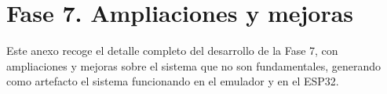 \documentclass[../main.tex]{subfiles}
\begin{document}
	\chapter{Fase 7. Ampliaciones y mejoras}
	\label{sec:DerarrolloFase7}
	
	Este anexo recoge el detalle completo del desarrollo de la Fase 7, con ampliaciones y mejoras sobre el sistema que no son fundamentales, generando como artefacto el sistema funcionando en el emulador y en el ESP32.
	
	
	\clearpage
	
	
\end{document}
